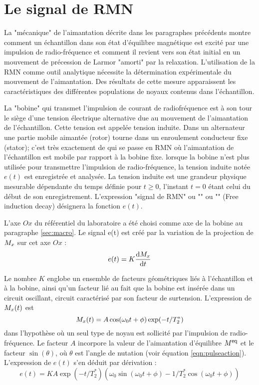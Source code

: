 
\section{Le signal de RMN}
La "mécanique" de l'aimantation décrite dans les paragraphes précédents montre
comment un échantillon dans son état d'équilibre magnétique est excité par une
impulsion de radio-fréquence et comment il revient vers son état initial en un
mouvement de précession de Larmor "amorti" par la relaxation.
L'utilisation de la RMN comme outil analytique nécessite la détermination
expérimentale du mouvement de l'aimantation.
Des résultats de cette mesure apparaissent les caractéristiques des
différentes populations de noyaux contenus dans l'échantillon.

La "bobine" qui transmet l'impulsion de courant de radiofréquence est à son
tour le siège d'une tension électrique alternative due au mouvement de
l'aimantation de l'échantillon.
Cette tension est appelée tension induite.
Dans un alternateur une partie mobile aimantée (rotor) tourne dans un
enroulement conducteur fixe (stator);
c'est très exactement de qui se passe en RMN où l'aimantation de l'échantillon
est mobile par rapport à la bobine fixe.
lorsque la bobine n'est plus utilisée pour transmettre
l'impulsion de radio-fréquence, la tension induite notée $e(t)$ est
enregistrée et analysée.
La tension induite est une grandeur physique mesurable dépendante du temps
définie pour $t \ge 0$,
l'instant $t = 0$ étant celui du début de son enregistrement.
L'expression "signal de RMN" ou "{\FIDfull}" ou "{\FID}"
(Free induction decay) désignera la fonction $e(t)$.

L'axe $Ox$ du référentiel du laboratoire a été choisi comme axe de la bobine au
paragraphe \ref{sec:macro}.
Le signal e(t) est créé par la variation de la projection de $M_x$ sur cet axe $Ox$ :
\begin{equation}
e(t) = K \frac{\mbox{d}M_x}{\mbox{d} t}
\end{equation}

Le nombre $K$ englobe un ensemble de facteurs géométriques liés à l'échantillon et à la
bobine, ainsi qu'un facteur lié au fait que la bobine est insérée dans
un circuit oscillant, circuit caractérisé par son facteur de surtension.
L'expression de $M_x(t)$ est
\begin{equation}
M_x(t) = A \cos(\omega_0 t + \phi) \exp(-t/T_2^*)
\end{equation}
dans l'hypothèse où un seul type de noyau est sollicité par l'impulsion de radio-fréquence.
Le facteur $A$ incorpore la valeur de l'aimantation d'équilibre $M^{\mbox{\footnotesize{eq}}}$ et le
facteur $\sin(\theta)$, où $\theta$ est l'angle de nutation (voir équation \ref{eqn:pulseaction}).
L'expression de $e(t)$ s'en déduit par dérivation :
\begin{equation}
e(t) = K A \exp(-t/T_2^*) (\omega_0 \sin(\omega_0 t + \phi) -
1/T_2^* \cos(\omega_0 t + \phi) )
\end{equation}

